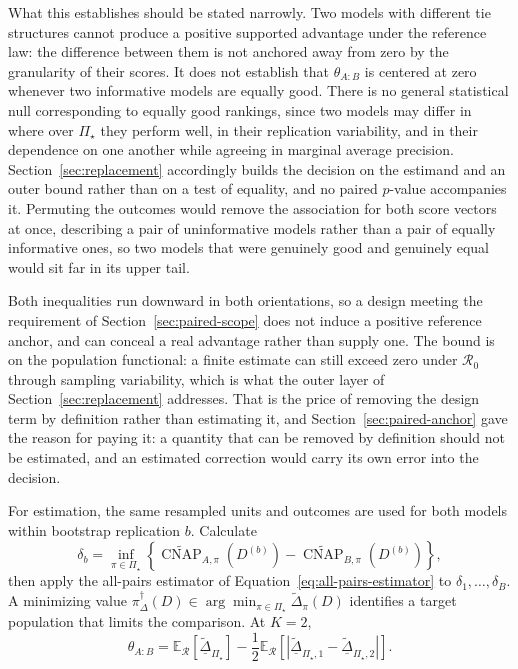 \documentclass[11pt]{article}
\newcommand{\CNAP}{\operatorname{CNAP}}
\newcommand{\Regime}{\mathcal{R}}
\newcommand{\PSet}{\Pi_\star}
\newcommand{\E}{\mathbb{E}}
\newcommand{\CNAPta}{\widetilde{\CNAP}}
\newcommand{\Dta}{\widetilde{\Delta}}
\newcommand{\RobDta}{\underline{\widetilde{\Delta}}_{\PSet}}
\theoremstyle{remark}
\begin{document}
What this establishes should be stated narrowly. Two models with different tie structures cannot produce a positive supported advantage under the reference law: the difference between them is not anchored away from zero by the granularity of their scores. It does not establish that $\theta_{A:B}$ is centered at zero whenever two informative models are equally good. There is no general statistical null corresponding to equally good rankings, since two models may differ in where over $\PSet$ they perform well, in their replication variability, and in their dependence on one another while agreeing in marginal average precision. Section~\ref{sec:replacement} accordingly builds the decision on the estimand and an outer bound rather than on a test of equality, and no paired $p$-value accompanies it. Permuting the outcomes would remove the association for both score vectors at once, describing a pair of uninformative models rather than a pair of equally informative ones, so two models that were genuinely good and genuinely equal would sit far in its upper tail.

Both inequalities run downward in both orientations, so a design meeting the requirement of Section~\ref{sec:paired-scope} does not induce a positive reference anchor, and can conceal a real advantage rather than supply one. The bound is on the population functional: a finite estimate can still exceed zero under $\Regime_0$ through sampling variability, which is what the outer layer of Section~\ref{sec:replacement} addresses. That is the price of removing the design term by definition rather than estimating it, and Section~\ref{sec:paired-anchor} gave the reason for paying it: a quantity that can be removed by definition should not be estimated, and an estimated correction would carry its own error into the decision.

For estimation, the same resampled units and outcomes are used for both models within bootstrap replication $b$. Calculate
\[
\delta_b
=
\inf_{\pi\in\PSet}
\left\{
\CNAPta_{A,\pi}(D^{(b)})
-
\CNAPta_{B,\pi}(D^{(b)})
\right\},
\]
then apply the all-pairs estimator of Equation~\eqref{eq:all-pairs-estimator} to $\delta_1,\ldots,\delta_B$. A minimizing value $\pi_\Delta^\dagger(D)\in\arg\min_{\pi\in\PSet}\Dta_\pi(D)$ identifies a target population that limits the comparison. At $K=2$,
\begin{equation}
\theta_{A:B}
=
\E_{\Regime}[\RobDta]
-
\frac12
\E_{\Regime}
\left[
|\underline{\widetilde{\Delta}}_{\PSet,1}-\underline{\widetilde{\Delta}}_{\PSet,2}|
\right].
\label{eq:robust-paired-k2}
\end{equation}
\end{document}
